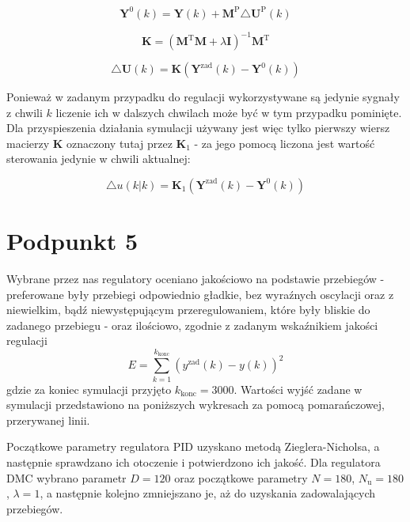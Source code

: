 \begin{equation}
\boldsymbol{Y}^{0}(k) = \boldsymbol{Y}(k) + \boldsymbol{M}^{\mathrm{P}} \triangle \boldsymbol{U}^{\mathrm{P}}(k)
\label{Y0k}
\end{equation}

\begin{equation}
\boldsymbol{K} = (\boldsymbol{M}^{\mathrm{T}} \boldsymbol{M} + \lambda \boldsymbol{I})^{-1} \boldsymbol{M}^{\mathrm{T}}
\label{Karray}
\end{equation}

\begin{equation}
\triangle \boldsymbol{U}(k) = \boldsymbol{K}(\boldsymbol{Y}^{\mathrm{zad}}(k) - \boldsymbol{Y}^{0}(k))
\label{dukdmc}
\end{equation}

Ponieważ w zadanym przypadku do regulacji wykorzystywane są jedynie sygnały z chwili $k$ liczenie ich w dalszych chwilach może być w tym przypadku pominięte. Dla przyspieszenia działania symulacji używany jest więc tylko pierwszy wiersz macierzy $\boldsymbol{K}$ oznaczony tutaj przez $\boldsymbol{K}_1$ - za jego pomocą liczona jest wartość sterowania jedynie w chwili aktualnej:

\begin{equation}
	\triangle u(k|k) = \boldsymbol{K}_1 (\boldsymbol{Y}^{\mathrm{zad}}(k) - \boldsymbol{Y}^{0}(k))
\end{equation}

\chapter{Podpunkt 5}
Wybrane przez nas regulatory oceniano jakościowo na podstawie przebiegów - preferowane były przebiegi odpowiednio gładkie, bez wyraźnych oscylacji oraz z niewielkim, bądź niewystępującym przeregulowaniem, które były bliskie do zadanego przebiegu - oraz ilościowo, zgodnie z zadanym wskaźnikiem jakości regulacji
\begin{equation}
E = \sum_{k=1}^{k_{\mathrm{konc}}}(y^{\mathrm{zad}}(k) - y(k))^2
\label{E}
\end{equation}
gdzie za koniec symulacji przyjęto $k_{\mathrm{konc}}=3000$. Wartości wyjść zadane w symulacji przedstawiono na poniższych wykresach za pomocą pomarańczowej, przerywanej linii.

Początkowe parametry regulatora PID uzyskano metodą Zieglera-Nicholsa, a następnie sprawdzano ich otoczenie i potwierdzono ich jakość. Dla regulatora DMC wybrano parametr $D=120$ oraz początkowe parametry $N=180$, $N_{\mathrm{u}}=180$, $\lambda=1$, a następnie kolejno zmniejszano je, aż do uzyskania zadowalających przebiegów.


